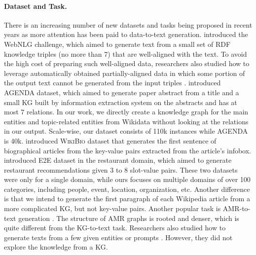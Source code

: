 \documentclass[11pt,a4paper]{article}
\begin{document}
\paragraph{Dataset and Task.}
There is an increasing number of new datasets and tasks being proposed in recent years as more attention has been paid to data-to-text generation.
\citet{gardent2017webnlg} introduced the WebNLG challenge, which aimed to generate text from a small set of RDF knowledge triples (no more than 7) that are well-aligned with the text. To avoid the high cost of preparing such well-aligned data, researchers also studied how to leverage automatically obtained partially-aligned data in which some portion of the output text cannot be generated from the input triples \cite{fuzihao2020partially}.
\citet{koncel2019text} introduced AGENDA dataset, which aimed to generate paper abstract from a title and a small KG built by information extraction system on the abstracts and has at most 7 relations. 
In our work, we directly create a knowledge graph for the main entities and topic-related entities from Wikidata without looking at the relations in our output.
Scale-wise, our dataset consists of 110k instances while AGENDA is 40k.
\citet{lebret2016neural} introduced W\textsc{iki}B\textsc{io} dataset that generates the first sentence of biographical articles from the key-value pairs extracted from the article's infobox. 
\citet{novikova2017e2e} 
introduced E2E dataset in the restaurant domain, which aimed to generate restaurant recommendations given 3 to 8 slot-value pairs.
These two datasets were only for a single domain, while ours focuses on multiple domains of over 100 categories, including people, event, location, organization, etc. 
Another difference is that we intend to generate the first paragraph of each Wikipedia article from a more complicated KG, but not key-value pairs.
Another popular task is AMR-to-text generation \cite{konstas2017neural}. The structure of AMR graphs is rooted and denser, which is quite different from the KG-to-text task.
Researchers also studied how to generate texts from a few given entities or prompts \cite{DBLP:conf/aaai/LiBQC0Y19,DBLP:conf/aaai/FuBL20}. However, they did not explore the knowledge from a KG. 
\end{document}
